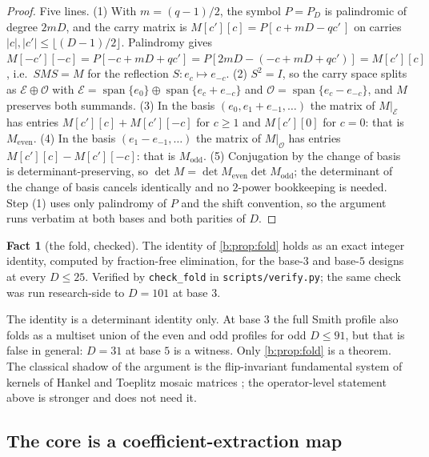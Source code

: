\documentclass[11pt]{amsart}
\theoremstyle{definition}
\newtheorem{fact}[theorem]{Fact}
\theoremstyle{remark}
\begin{document}
\begin{proof}
Five lines. (1) With $m = (q-1)/2$, the symbol $P = P_D$ is palindromic of degree $2mD$, and the carry matrix is $M[c'][c] = P[\,c + mD - qc'\,]$ on carries $|c|, |c'| \le \lfloor (D-1)/2 \rfloor$. Palindromy gives $M[-c'][-c] = P[-c + mD + qc'] = P[2mD - (-c + mD + qc')] = M[c'][c]$, i.e.\ $SMS = M$ for the reflection $S : e_c \mapsto e_{-c}$. (2) $S^2 = I$, so the carry space splits as $\mathcal{E} \oplus \mathcal{O}$ with $\mathcal{E} = \operatorname{span}\{e_0\} \oplus \operatorname{span}\{e_c + e_{-c}\}$ and $\mathcal{O} = \operatorname{span}\{e_c - e_{-c}\}$, and $M$ preserves both summands. (3) In the basis $(e_0, e_1 + e_{-1}, \dots)$ the matrix of $M|_{\mathcal{E}}$ has entries $M[c'][c] + M[c'][-c]$ for $c \ge 1$ and $M[c'][0]$ for $c = 0$: that is $M_{\mathrm{even}}$. (4) In the basis $(e_1 - e_{-1}, \dots)$ the matrix of $M|_{\mathcal{O}}$ has entries $M[c'][c] - M[c'][-c]$: that is $M_{\mathrm{odd}}$. (5) Conjugation by the change of basis is determinant-preserving, so $\det M = \det M_{\mathrm{even}} \det M_{\mathrm{odd}}$; the determinant of the change of basis cancels identically and no $2$-power bookkeeping is needed. Step (1) uses only palindromy of $P$ and the shift convention, so the argument runs verbatim at both bases and both parities of $D$.
\end{proof}

\begin{fact}[the fold, checked]
\label{b:fact:fold}
The identity of \cref{b:prop:fold} holds as an exact integer identity, computed by fraction-free elimination, for the base-$3$ and base-$5$ designs at every $D \le 25$. Verified by \texttt{check\_fold} in \texttt{scripts/verify.py}; the same check was run research-side to $D = 101$ at base $3$.
\end{fact}

The identity is a determinant identity only. At base $3$ the full Smith profile also folds as a multiset union of the even and odd profiles for odd $D \le 91$, but that is false in general: $D = 31$ at base $5$ is a witness. Only \cref{b:prop:fold} is a theorem. The classical shadow of the argument is the flip-invariant fundamental system of kernels of Hankel and Toeplitz mosaic matrices \cite{heinig}; the operator-level statement above is stronger and does not need it.

\subsection*{The core is a coefficient-extraction map}
\end{document}

